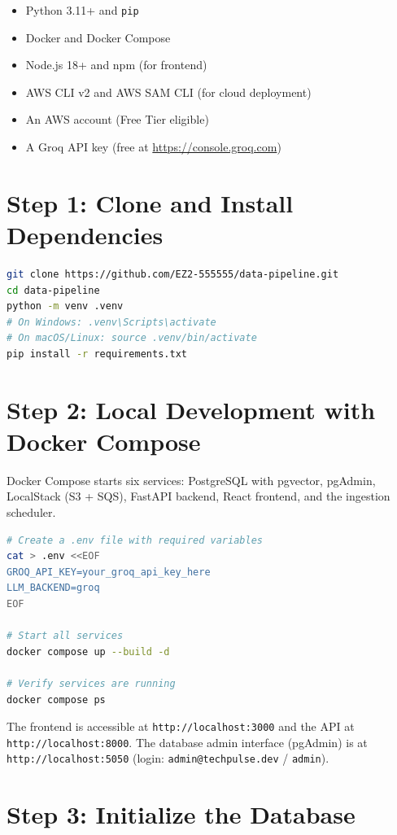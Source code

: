 \begin{itemize}[leftmargin=0.5in]
  \item Python 3.11+ and \texttt{pip}
  \item Docker and Docker Compose
  \item Node.js 18+ and npm (for frontend)
  \item AWS CLI v2 and AWS SAM CLI (for cloud deployment)
  \item An AWS account (Free Tier eligible)
  \item A Groq API key (free at \url{https://console.groq.com})
\end{itemize}

\section*{Step 1: Clone and Install Dependencies}

\begin{lstlisting}[language=bash, basicstyle=\ttfamily\small]
git clone https://github.com/EZ2-555555/data-pipeline.git
cd data-pipeline
python -m venv .venv
# On Windows: .venv\Scripts\activate
# On macOS/Linux: source .venv/bin/activate
pip install -r requirements.txt
\end{lstlisting}

\section*{Step 2: Local Development with Docker Compose}

Docker Compose starts six services: PostgreSQL with pgvector, pgAdmin, LocalStack (S3 + SQS), FastAPI backend, React frontend, and the ingestion scheduler.

\begin{lstlisting}[language=bash, basicstyle=\ttfamily\small]
# Create a .env file with required variables
cat > .env <<EOF
GROQ_API_KEY=your_groq_api_key_here
LLM_BACKEND=groq
EOF

# Start all services
docker compose up --build -d

# Verify services are running
docker compose ps
\end{lstlisting}

\noindent The frontend is accessible at \texttt{http://localhost:3000} and the API at \texttt{http://localhost:8000}. The database admin interface (pgAdmin) is at \texttt{http://localhost:5050} (login: \texttt{admin@techpulse.dev} / \texttt{admin}).

\section*{Step 3: Initialize the Database}

